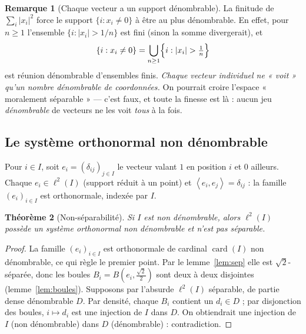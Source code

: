 \documentclass[11pt,a4paper]{article}
\theoremstyle{plain}
\newtheorem{theoreme}{Théorème}[section]
\theoremstyle{definition}
\newtheorem{remarque}[theoreme]{Remarque}
\newcommand{\abs}[1]{\left\lvert #1 \right\rvert}
\newcommand{\scal}[2]{\left\langle #1 , #2 \right\rangle}
\newcommand{\card}{\operatorname{card}}
\begin{document}
\begin{remarque}[Chaque vecteur a un support dénombrable]\label{rem:support}
La finitude de $\sum_i \abs{x_i}^2$ force le support
$\{i : x_i \neq 0\}$ à être au plus dénombrable. En effet, pour $n \ge 1$
l'ensemble $\{i : \abs{x_i} > 1/n\}$ est fini (sinon la somme divergerait), et
\[
  \{i : x_i \neq 0\} = \bigcup_{n \ge 1} \Bigl\{ i : \abs{x_i} > \tfrac1n \Bigr\}
\]
est réunion dénombrable d'ensembles finis. \emph{Chaque vecteur individuel ne
« voit » qu'un nombre dénombrable de coordonnées.} On pourrait croire l'espace
« moralement séparable » — c'est faux, et toute la finesse est là : aucun jeu
\emph{dénombrable} de vecteurs ne les voit \emph{tous} à la fois.
\end{remarque}

\subsection{Le système orthonormal non dénombrable}

Pour $i \in I$, soit $e_i = (\delta_{ij})_{j\in I}$ le vecteur valant $1$ en
position $i$ et $0$ ailleurs. Chaque $e_i \in \ell^2(I)$ (support réduit à un
point) et $\scal{e_i}{e_j} = \delta_{ij}$ : la famille $(e_i)_{i\in I}$ est
orthonormale, indexée par $I$.

\begin{theoreme}[Non-séparabilité]\label{th:nonsep}
Si $I$ est non dénombrable, alors $\ell^2(I)$ possède un système orthonormal non
dénombrable et n'est pas séparable.
\end{theoreme}

\begin{proof}
La famille $(e_i)_{i\in I}$ est orthonormale de cardinal $\card(I)$ non
dénombrable, ce qui règle le premier point. Par le lemme~\ref{lem:sep} elle est
$\sqrt2$-séparée, donc les boules $B_i = B\!\left(e_i, \tfrac{\sqrt2}{2}\right)$
sont deux à deux disjointes (lemme~\ref{lem:boules}). Supposons par l'absurde
$\ell^2(I)$ séparable, de partie dense dénombrable $D$. Par densité, chaque $B_i$
contient un $d_i \in D$ ; par disjonction des boules, $i \mapsto d_i$ est une
injection de $I$ dans $D$. On obtiendrait une injection de $I$ (non dénombrable)
dans $D$ (dénombrable) : contradiction.
\end{proof}
\end{document}
